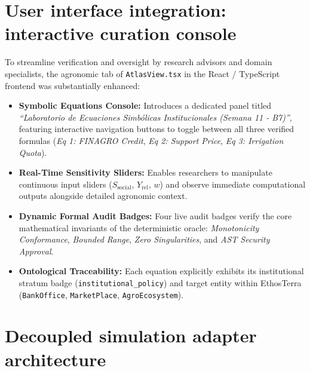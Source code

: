 \documentclass[11pt,a4paper]{article}
\begin{document}
\section{User interface integration: interactive curation console}

To streamline verification and oversight by research advisors and domain specialists, the agronomic tab of \texttt{AtlasView.tsx} in the React / TypeScript frontend was substantially enhanced:

\begin{itemize}[leftmargin=*]
    \item \textbf{Symbolic Equations Console:} Introduces a dedicated panel titled \textit{``Laboratorio de Ecuaciones Simb\'olicas Institucionales (Semana 11 - B7)''}, featuring interactive navigation buttons to toggle between all three verified formulas (\textit{Eq 1: FINAGRO Credit}, \textit{Eq 2: Support Price}, \textit{Eq 3: Irrigation Quota}).
    \item \textbf{Real-Time Sensitivity Sliders:} Enables researchers to manipulate continuous input sliders ($S_{\text{social}}$, $Y_{\text{rel}}$, $w$) and observe immediate computational outputs alongside detailed agronomic context.
    \item \textbf{Dynamic Formal Audit Badges:} Four live audit badges verify the core mathematical invariants of the deterministic oracle: \textit{Monotonicity Conformance}, \textit{Bounded Range}, \textit{Zero Singularities}, and \textit{AST Security Approval}.
    \item \textbf{Ontological Traceability:} Each equation explicitly exhibits its institutional stratum badge (\texttt{institutional\_policy}) and target entity within EthosTerra (\texttt{BankOffice}, \texttt{MarketPlace}, \texttt{AgroEcosystem}).
\end{itemize}

\section{Decoupled simulation adapter architecture}
\end{document}
